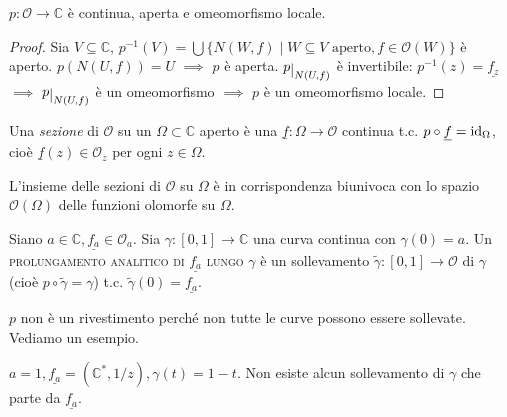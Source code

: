 \begin{prop}
  $p: \mathcal{O} \longrightarrow \mathbb{C}$ è continua, aperta e omeomorfismo locale.
\end{prop}

\begin{proof}
  Sia $V \subseteq \mathbb{C}$, $\displaystyle p^{-1}(V)=\bigcup\{N(W, f) \mid W \subseteq V \text{ aperto}, f \in \mathcal{O}(W)\}$ è aperto. $p(N(U, f))=U$ $\implies$ $p$ è aperta.
  $p\restrict{N(U, f)}$ è invertibile: $p^{-1}(z)=\underline{f_z}$ $\implies$ $p\restrict{N(U, f)}$ è un omeomorfismo $\implies$ $p$ è un omeomorfismo locale.
\end{proof}

\begin{defn}
  Una \textit{sezione} di $\mathcal{O}$ su un $\Omega \subset \mathbb{C}$ aperto è una $\underline{f}:\Omega \longrightarrow \mathcal{O}$ continua t.c. $p \circ \underline{f}=\operatorname{id}_{\Omega}$, cioè $\underline{f}(z) \in \mathcal{O}_z$ per ogni $z \in \Omega$.
\end{defn}

\begin{exc}
  L'insieme delle sezioni di $\mathcal{O}$ su $\Omega$ è in corrispondenza biunivoca con lo spazio $\mathcal{O}(\Omega)$ delle funzioni olomorfe su $\Omega$.
\end{exc}

\begin{defn}
  Siano $a \in \mathbb{C}, \underline{f_a} \in \mathcal{O}_a$. Sia $\gamma:[0, 1] \longrightarrow \mathbb{C}$ una curva continua con $\gamma(0)=a$.
  Un \textsc{prolungamento analitico di $\underline{f_a}$ lungo $\gamma$} è un sollevamento $\tilde{\gamma}:[0, 1] \longrightarrow \mathcal{O}$ di $\gamma$ (cioè $p \circ \tilde{\gamma}=\gamma$) t.c. $\tilde{\gamma}(0)=\underline{f_a}$.
\end{defn}

\begin{oss}
  $p$ non è un rivestimento perché non tutte le curve possono essere sollevate. Vediamo un esempio.
\end{oss}

\begin{ex}
  $a=1, \underline{f_a}=(\mathbb{C}^*, 1/z), \gamma(t)=1-t$. Non esiste alcun sollevamento di $\gamma$ che parte da $\underline{f_a}$.
\end{ex}
